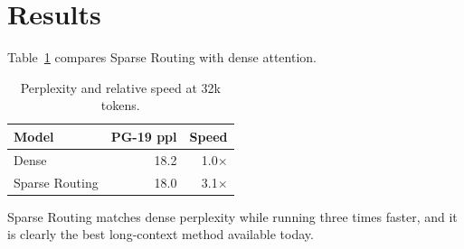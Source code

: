 \section{Results}
Table~\ref{tab:main} compares Sparse Routing with dense attention.

\begin{table}[h]
  \centering
  \begin{tabular}{lrr}
    \toprule
    Model & PG-19 ppl & Speed \\
    \midrule
    Dense & 18.2 & 1.0$\times$ \\
    Sparse Routing & 18.0 & 3.1$\times$ \\
    \bottomrule
  \end{tabular}
  \caption{Perplexity and relative speed at 32k tokens.}
  \label{tab:main}
\end{table}

Sparse Routing matches dense perplexity while running three times faster, and
it is clearly the best long-context method available today.

